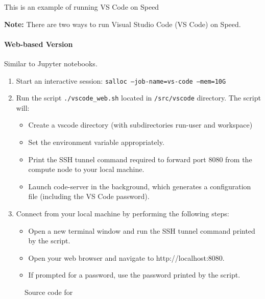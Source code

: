 This is an example of running VS Code on Speed

\textbf{Note: } There are two ways to run Visual Studio Code (VS Code) on Speed.

\paragraph{Web-based Version}
\label{sect:web-based-vscode}
Similar to Jupyter notebooks.

\begin{enumerate}
    \item Start an interactive session: \texttt{salloc --job-name=vs-code --mem=10G}
    \item Run the script \texttt{./vscode\_web.sh} located in \texttt{/src/vscode} directory. The script will:
    \begin{itemize}
        \item Create a vscode directory (with subdirectories run-user and workspace)
        \item Set the environment variable  appropriately.
        \item Print the SSH tunnel command required to forward port 8080 from the compute node to your local machine.
        \item Launch code-server in the background, which generates a configuration file (including the VS Code password).
    \end{itemize}
    \item Connect from your local machine by performing the following steps:
    \begin{itemize}
        \item Open a new terminal window and run the SSH tunnel command printed by the script.
        \item Open your web browser and navigate to http://localhost:8080.
        \item If prompted for a password, use the password printed by the script.
    \end{itemize}
\end{enumerate}

\small
\begin{figure}[htpb]
    
    \caption{Source code for }
    \label{fig:vscode_web.sh}
\end{figure}
\normalsize

